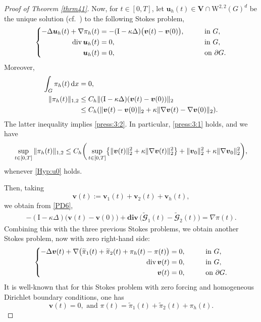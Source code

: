 \documentclass[12pt,reqno]{amsart}
\numberwithin{equation}{section}
\let\originalleft\left
\let\originalright\right
\renewcommand{\left}{\mathopen{}\mathclose\bgroup\originalleft}
\renewcommand{\right}{\aftergroup\egroup\originalright}
\theoremstyle{definition}
\def\div{\operatorname{div}}
\def\divv{\mathbf{div}\,}
\def\I{\mathrm{I}}
\def\W{\mathrm{W}}
\def\uu{\boldsymbol{u}}  %
\def\vv{\boldsymbol{v}}
\def\bfV{\mathbf{V}}
\def\bcG{\mathbfcal{G}}
\begin{document}
\begin{proof}[Proof of Theorem \ref{thrm41}]
{Now, for $t \in [0,T]$, let $\uu_h(t) \in \bfV \cap \W^{2,2}(G)^d$ be the unique solution (cf.~\cite[Theorem~IV.6.1]{Galdi:2011}) to the following Stokes problem,
\begin{equation}
\left\{\begin{aligned}
   -\Delta \uu_h(t) + \nabla \pi_h(t) &= -(\I - \kappa \Delta) \big(\vv(t) - \vv(0)\big), \qquad &&\text{in } G, \\
  \div\uu_h(t)& = 0, \qquad &&\text{in } G, \\
   \uu_h(t) &= 0, \qquad &&\text{on } \partial G.
\end{aligned}
\right.
\end{equation}
Moreover,
\begin{alignat}{2}
 \int_G \pi_h(t)\, \mathrm{d}x &= 0, \label{prop:pi:h} \\ \nonumber
 \|\pi_h(t)\|_{1,2} &\leq C_h \|(\I - \kappa \Delta)(\vv(t) - \vv(0))\|_2\\& \leq
C_h \left( \|\vv(t) - \vv(0)\|_2 + \kappa \|\nabla \vv(t) - \nabla \vv(0)\|_2 \right). \label{prop:grad:pi:h}
\end{alignat}
The latter inequality implies \eqref{press:3:2}. In particular, \eqref{press:3:1} holds, and we have
\begin{equation*} %
\sup_{t \in [0,T]} \|\pi_h(t)\|_{1,2} \leq C_h \bigg( \sup_{t \in [0,T]} \left\{ \|\vv(t)\|_2^2 + \kappa \|\nabla \vv(t)\|_2^2 \right\} + \|\vv_0\|_2^2 + \kappa \|\nabla \vv_0\|_2^2 \bigg),
\end{equation*}
whenever \eqref{Hyp:u0} holds.

Then, taking
\begin{equation*}
  \vv(t) := \vv_1(t) + \vv_2(t) + \vv_h(t),
\end{equation*}
we obtain from \eqref{PD6},
\begin{align*}%
-(\I - \kappa \Delta) \big(\vv(t) - \vv(0)\big) + \divv\big(\widetilde{\bcG}_1(t) - \widetilde{\bcG}_2(t)\big) = \nabla \pi(t).
\end{align*}
Combining this with the three previous Stokes problems, we obtain another Stokes problem, now with zero right-hand side:
\begin{equation*}
	\left\{\begin{aligned}
   -\Delta \vv(t) + \nabla\big(\widetilde{\pi}_1(t) + \widetilde{\pi}_2(t) + \pi_h(t) - \pi(t)\big) &= 0, \qquad &&\text{in } G, \\
   \div\vv(t) &= 0, \qquad &&\text{in } G, \\
   \vv(t) &= 0, \qquad &&\text{on } \partial G.
\end{aligned}
\right.
\end{equation*}
It is well-known that for this Stokes problem with zero forcing and homogeneous Dirichlet boundary conditions, one has
\begin{equation*}
\vv(t) = 0, \text{ and } \pi(t) = \widetilde{\pi}_1(t) + \widetilde{\pi}_2(t) + \pi_h(t).
\end{equation*}

}
\end{proof}
\end{document}

